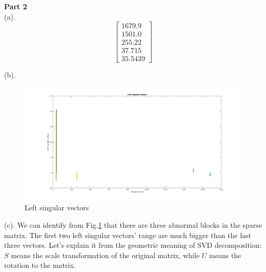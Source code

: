 \documentclass[11pt]{article}
\begin{document}
\noindent
\textbf{Part 2} \\
(a). %
$$
\begin{bmatrix} 
    1679.9  \\
    1501.0  \\ 
    255.22  \\
    37.715  \\
    35.5439
\end{bmatrix}
$$

\noindent
(b). 
\begin{figure}[!h]
    \centering
    \includegraphics[width=\linewidth]{figs/q3.jpg}
    \caption{Left singular vectors}
    \label{fig::vec}
\end{figure}

\noindent
(c). We can identify from Fig.\ref{fig::vec} that there are three abnormal blocks in the sparse matrix. The first two left singular vectors' range are much bigger than the last three vectors. Let's explain it from the geometric meaning of SVD decomposition: $S$ means the scale transformation of the original matrix, while $U$ means the rotation to the matrix. 
\end{document}
